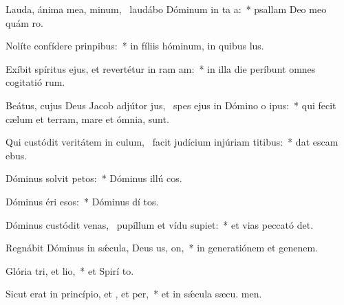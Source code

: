 \item Lauda, ánima mea, minum,~\pscross{} laudábo Dóminum in ta a:~* psallam Deo meo quám ro.
\item Nolíte confídere  prinpibus:~* in fíliis hóminum, in quibus   lus.
\item Exíbit spíritus ejus, et revertétur in ram am:~* in illa die períbunt omnes cogitatió rum.
\item Beátus, cujus Deus Jacob adjútor jus,~\pscross{} spes ejus in Dómino o ipus:~* qui fecit cælum et terram, mare et ómnia,    sunt.
\item Qui custódit veritátem in culum,~\pscross{} facit judícium injúriam titibus:~* dat escam ebus.
\item Dóminus solvit petos:~* Dóminus illú cos.
\item Dóminus éri esos:~* Dóminus dí tos.
\item Dóminus custódit venas,~\pscross{} pupíllum et vídu supiet:~* et vias peccató det.
\item Regnábit Dóminus in sǽcula, Deus us, on,~* in generatiónem et genenem.
\item Glória tri, et lio,~* et Spirí to.
\item Sicut erat in princípio, et , et per,~* et in sǽcula sæcu. men.
